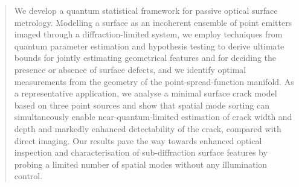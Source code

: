 \documentclass[reprint,amsmath,amssymb,aps,prl,floatfix,groupedaddress,superscriptaddress]{revtex4-2}
\begin{document}
\begin{abstract}
We develop a quantum statistical framework for passive optical surface metrology. Modelling a surface as an incoherent ensemble of point emitters imaged through a diffraction-limited system, we employ techniques from quantum parameter estimation and hypothesis testing to derive ultimate bounds for jointly estimating geometrical features and for deciding the presence or absence of surface defects, and we identify optimal measurements from the geometry of the point-spread-function manifold.  As a representative application, we analyse a minimal surface crack model based on three point sources and show that spatial mode sorting can simultaneously enable near-quantum-limited estimation of crack width and depth and markedly enhanced detectability of the crack, compared with direct imaging. Our results pave the way towards enhanced optical inspection and characterisation of sub-diffraction surface features by probing a limited number of spatial modes without any illumination control.
\end{abstract}
\end{document}
